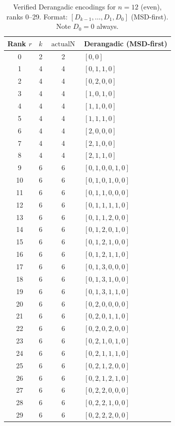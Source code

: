 \documentclass[11pt,a4paper]{article}
\newcommand{\actualN}{\operatorname{actualN}}
\begin{document}
    \begin{table}[h]
        \centering
        \caption{Verified Derangadic encodings for $n=12$ (even), ranks 0--29.
        Format: $[D_{k-1},\dots,D_1,D_0]$ (MSD-first). Note $D_0=0$ always.}
        \label{tab:n12-verified}
        \begin{tabular}{cccl}
            \toprule
            Rank $r$ & $k$ & $\actualN$ & Derangadic (MSD-first) \\
            \midrule
            0 & 2 & 2 & $[0, 0]$ \\
            1 & 4 & 4 & $[0, 1, 1, 0]$ \\
            2 & 4 & 4 & $[0, 2, 0, 0]$ \\
            3 & 4 & 4 & $[1, 0, 1, 0]$ \\
            4 & 4 & 4 & $[1, 1, 0, 0]$ \\
            5 & 4 & 4 & $[1, 1, 1, 0]$ \\
            6 & 4 & 4 & $[2, 0, 0, 0]$ \\
            7 & 4 & 4 & $[2, 1, 0, 0]$ \\
            8 & 4 & 4 & $[2, 1, 1, 0]$ \\
            9 & 6 & 6 & $[0, 1, 0, 0, 1, 0]$ \\
            10 & 6 & 6 & $[0, 1, 0, 1, 0, 0]$ \\
            11 & 6 & 6 & $[0, 1, 1, 0, 0, 0]$ \\
            12 & 6 & 6 & $[0, 1, 1, 1, 1, 0]$ \\
            13 & 6 & 6 & $[0, 1, 1, 2, 0, 0]$ \\
            14 & 6 & 6 & $[0, 1, 2, 0, 1, 0]$ \\
            15 & 6 & 6 & $[0, 1, 2, 1, 0, 0]$ \\
            16 & 6 & 6 & $[0, 1, 2, 1, 1, 0]$ \\
            17 & 6 & 6 & $[0, 1, 3, 0, 0, 0]$ \\
            18 & 6 & 6 & $[0, 1, 3, 1, 0, 0]$ \\
            19 & 6 & 6 & $[0, 1, 3, 1, 1, 0]$ \\
            20 & 6 & 6 & $[0, 2, 0, 0, 0, 0]$ \\
            21 & 6 & 6 & $[0, 2, 0, 1, 1, 0]$ \\
            22 & 6 & 6 & $[0, 2, 0, 2, 0, 0]$ \\
            23 & 6 & 6 & $[0, 2, 1, 0, 1, 0]$ \\
            24 & 6 & 6 & $[0, 2, 1, 1, 1, 0]$ \\
            25 & 6 & 6 & $[0, 2, 1, 2, 0, 0]$ \\
            26 & 6 & 6 & $[0, 2, 1, 2, 1, 0]$ \\
            27 & 6 & 6 & $[0, 2, 2, 0, 0, 0]$ \\
            28 & 6 & 6 & $[0, 2, 2, 1, 0, 0]$ \\
            29 & 6 & 6 & $[0, 2, 2, 2, 0, 0]$ \\
            \bottomrule
        \end{tabular}
    \end{table}
\end{document}
